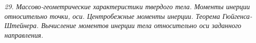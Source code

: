 \emph{29. Массово-геометрические характеристики твердого тела. Моменты инерции
относительно точки, оси. Центробежные моменты инерции. Теорема
Гюйгенса-Штейнера. Вычисление моментов инерции тела относительно оси
заданного направления.}

\newpage
